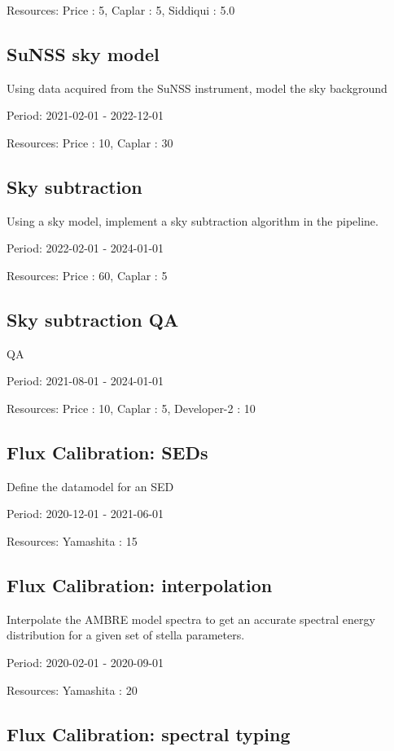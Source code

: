 Resources: Price : 5, Caplar : 5, Siddiqui : 5.0

\subsection{SuNSS sky model}

Using data acquired from the SuNSS instrument, model the sky background

Period: 2021-02-01 - 2022-12-01

Resources: Price : 10, Caplar : 30

\subsection{Sky subtraction}

Using a sky model, implement a sky subtraction algorithm in the pipeline.

Period: 2022-02-01 - 2024-01-01

Resources: Price : 60, Caplar : 5

\subsection{Sky subtraction QA}

QA

Period: 2021-08-01 - 2024-01-01

Resources: Price : 10, Caplar : 5, Developer-2 : 10

\subsection{Flux Calibration: SEDs}

Define the datamodel for an SED

Period: 2020-12-01 - 2021-06-01

Resources: Yamashita : 15

\subsection{Flux Calibration: interpolation}

Interpolate the AMBRE model spectra to get an accurate spectral energy distribution for a given set of stella parameters.

Period: 2020-02-01 - 2020-09-01

Resources: Yamashita : 20

\subsection{Flux Calibration: spectral typing}

